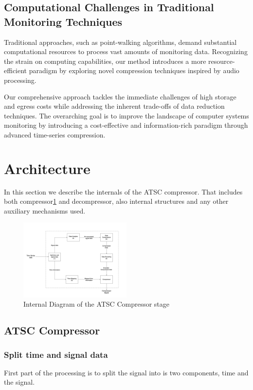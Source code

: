 \documentclass[conference]{IEEEtran}
\begin{document}
\subsection{Computational Challenges in Traditional Monitoring Techniques}
Traditional approaches, such as point-walking algorithms, demand substantial computational resources to process vast amounts of monitoring data\cite{10.14778/2735479.2735481}. Recognizing the strain on computing capabilities, our method introduces a more resource-efficient paradigm by exploring novel compression techniques inspired by audio processing.

Our comprehensive approach tackles the immediate challenges of high storage and egress costs while addressing the inherent trade-offs of data reduction techniques. The overarching goal is to improve the landscape of computer systems monitoring by introducing a cost-effective and information-rich paradigm through advanced time-series compression.  

\section{Architecture}

In this section we describe the internals of the ATSC compressor. That includes both compressor\ref{internal} and decompressor, also internal structures and any other auxiliary mechanisms used.

\begin{figure}[h]
  \centering
  \includegraphics[width=0.5\textwidth]{Fig2.png}
  \caption{Internal Diagram of the ATSC Compressor stage}
  \label{internal}
\end{figure}

\subsection{ATSC Compressor}

\subsubsection{Split time and signal data}
First part of the processing is to split the signal into is two components, time and the signal.
\end{document}
